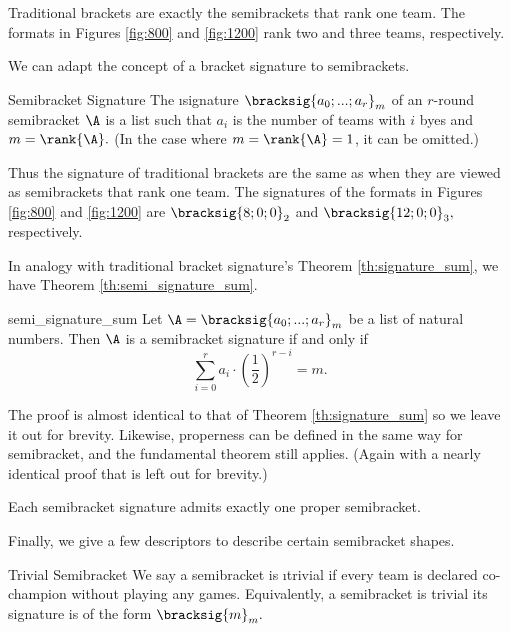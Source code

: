 {    Traditional brackets are exactly the semibrackets that rank one team. The formats in Figures \ref{fig:800} and \ref{fig:1200} rank two and three teams, respectively.

    We can adapt the concept of a bracket signature to semibrackets.

    \begin{definition}{Semibracket Signature}{}
        The \i{signature} $\bracksig{a_0; ...; a_r}_m$ of an $r$-round semibracket $\A$ is a list such that $a_i$ is the number of teams with $i$ byes and $m = \rank{\A}.$ (In the case where $m = \rank{\A} = 1$, it can be omitted.)
    \end{definition}

    Thus the signature of traditional brackets are the same as when they are viewed as semibrackets that rank one team. The signatures of the formats in Figures \ref{fig:800} and \ref{fig:1200} are $\bracksig{8;0;0}_2$ and $\bracksig{12;0;0}_3,$ respectively.

    In analogy with traditional bracket signature's Theorem \ref{th:signature_sum}, we have Theorem \ref{th:semi_signature_sum}.

    \begin{theorem}{}{semi_signature_sum}
        Let $\A = \bracksig{a_0; ...; a_r}_m$ be a list of natural numbers. Then $\A$ is a semibracket signature if and only if $$\sum_{i=0}^r a_i \cdot \left(\frac{1}{2}\right)^{r - i} = m.$$
    \end{theorem}

    The proof is almost identical to that of Theorem \ref{th:signature_sum} so we leave it out for brevity. Likewise, properness can be defined in the same way for semibracket, and the fundamental theorem still applies. (Again with a nearly identical proof that is left out for brevity.)

    \begin{theorem}{}{}
        Each semibracket signature admits exactly one proper semibracket.
    \end{theorem}

    Finally, we give a few descriptors to describe certain semibracket shapes.

    \begin{definition}{Trivial Semibracket}{}
        We say a semibracket is \i{trivial} if every team is declared co-champion without playing any games. Equivalently, a semibracket is trivial its signature is of the form $\bracksig{m}_m.$
    \end{definition}

}
